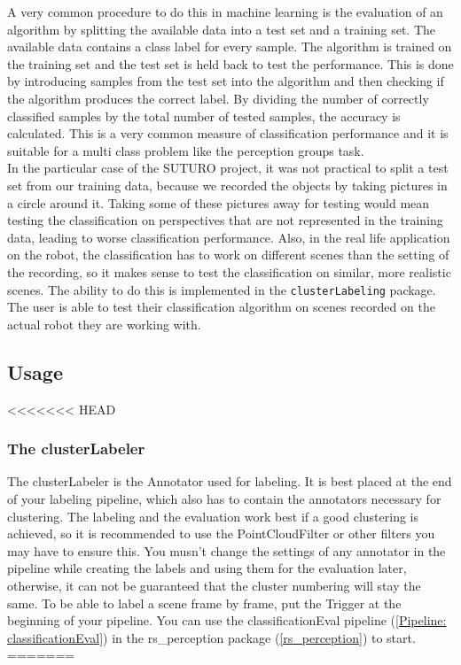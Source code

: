 \documentclass[main.tex]{subfiles}
\begin{document}
A very common procedure to do this in machine learning is the evaluation of an algorithm by splitting the available data into a test set and a training set. The available data contains a class label for every sample. The algorithm is trained on the training set and the test set is held back to test the performance. This is done by introducing samples from the test set into the algorithm and then checking if the algorithm produces the correct label. By dividing the number of correctly classified samples by the total number of tested samples, the accuracy is calculated. This is a very common measure of classification performance and it is suitable for a multi class problem like the perception groups task.\\

In the particular case of the SUTURO project, it was not practical to split a test set from our training data, because we recorded the objects by taking pictures in a circle around it. Taking some of these pictures away for testing would mean testing the classification on perspectives that are not represented in the training data, leading to worse classification performance. Also, in the real life application on the robot, the classification has to work on different scenes than the setting of the recording, so it makes sense to test the classification on similar, more realistic scenes. The ability to do this is implemented in the \texttt{clusterLabeling} package. The user is able to test their classification algorithm on scenes recorded on the actual robot they are working with.  

\subsection{Usage}\label{clusterLabeling Usage}

<<<<<<< HEAD
\subsubsection{The clusterLabeler}\label{clusterLabeler}
The clusterLabeler is the Annotator used for labeling. It is best placed at the end of your labeling pipeline, which also has to contain the annotators necessary for clustering. The labeling and the evaluation work best if a good clustering is achieved, so it is recommended to use the PointCloudFilter or other filters you may have to ensure this. You musn't change the settings of any annotator in the pipeline while creating the labels and using them for the evaluation later, otherwise, it can not be guaranteed that the cluster numbering will stay the same. To be able to label a scene frame by frame, put the Trigger at the beginning of your pipeline. You can use the classificationEval pipeline (\ref{Pipeline: classificationEval}) in the rs\_perception package (\ref{rs_perception}) to start.\\
=======
\end{document}
